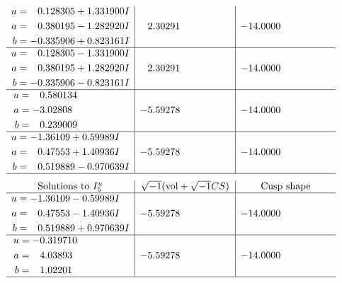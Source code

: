 \documentclass[1p]{elsarticle_modified}
\theoremstyle{definition}
\newcommand{\I}{\sqrt{-1}}
\begin{document}
$$\begin{array}{c|c|c}
\begin{aligned}
u &= \phantom{-}0.128305 + 1.331900 I \\
a &= \phantom{-}0.380195 - 1.282920 I \\
b &= -0.335906 + 0.823161 I\end{aligned}
 & \phantom{-}2.30291\phantom{ +0.000000I} & -14.0000\phantom{ +0.000000I} \\ \hline\begin{aligned}
u &= \phantom{-}0.128305 - 1.331900 I \\
a &= \phantom{-}0.380195 + 1.282920 I \\
b &= -0.335906 - 0.823161 I\end{aligned}
 & \phantom{-}2.30291\phantom{ +0.000000I} & -14.0000\phantom{ +0.000000I} \\ \hline\begin{aligned}
u &= \phantom{-}0.580134\phantom{ +0.000000I} \\
a &= -3.02808\phantom{ +0.000000I} \\
b &= \phantom{-}0.239009\phantom{ +0.000000I}\end{aligned}
 & -5.59278\phantom{ +0.000000I} & -14.0000\phantom{ +0.000000I} \\ \hline\begin{aligned}
u &= -1.36109 + 0.59989 I \\
a &= \phantom{-}0.47553 + 1.40936 I \\
b &= \phantom{-}0.519889 - 0.970639 I\end{aligned}
 & -5.59278\phantom{ +0.000000I} & -14.0000\phantom{ +0.000000I}\\
 \hline 
 \end{array}$$\newpage$$\begin{array}{c|c|c}  
\text{Solutions to }I^u_{5}& \I (\text{vol} + \sqrt{-1}CS) & \text{Cusp shape}\\
 \hline 
\begin{aligned}
u &= -1.36109 - 0.59989 I \\
a &= \phantom{-}0.47553 - 1.40936 I \\
b &= \phantom{-}0.519889 + 0.970639 I\end{aligned}
 & -5.59278\phantom{ +0.000000I} & -14.0000\phantom{ +0.000000I} \\ \hline\begin{aligned}
u &= -0.319710\phantom{ +0.000000I} \\
a &= \phantom{-}4.03893\phantom{ +0.000000I} \\
b &= \phantom{-}1.02201\phantom{ +0.000000I}\end{aligned}
 & -5.59278\phantom{ +0.000000I} & -14.0000\phantom{ +0.000000I}\\
 \hline 
 \end{array}$$\newpage\newpage\renewcommand{\arraystretch}{1}
\end{document}
